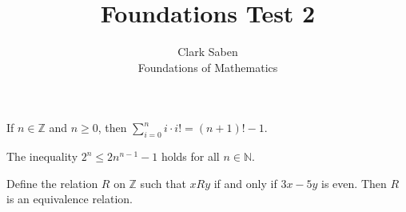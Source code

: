 \documentclass[12pt]{article}
\newenvironment{theorem}[2][Theorem]{\begin{trivlist}
\item[\hskip \labelsep {\bfseries #1}\hskip \labelsep {\bfseries #2.}]}{\end{trivlist}}
\begin{document}
 
 
\title{Foundations Test 2}%
\author{Clark Saben\\ %
Foundations of Mathematics} %
 
\maketitle

\section{}
\begin{theorem}1
	If $n \in \mathbb{Z}$ and $n \geq 0$, then $\sum_{i=0}^{n}i\cdot i! = \left(n+1 \right)!-1$.
\end{theorem}
\begin{theorem}2
	The inequality $2^n \leq 2n^{n-1}-1$ holds for all $n \in \mathbb{N}$.
\end{theorem}
\begin{theorem}3
	Define the relation $R$ on $\mathbb{Z}$ such that $xRy$ if and only if $3x-5y$ is even. Then $R$ is an equivalence relation.
\end{theorem}
\end{document}
